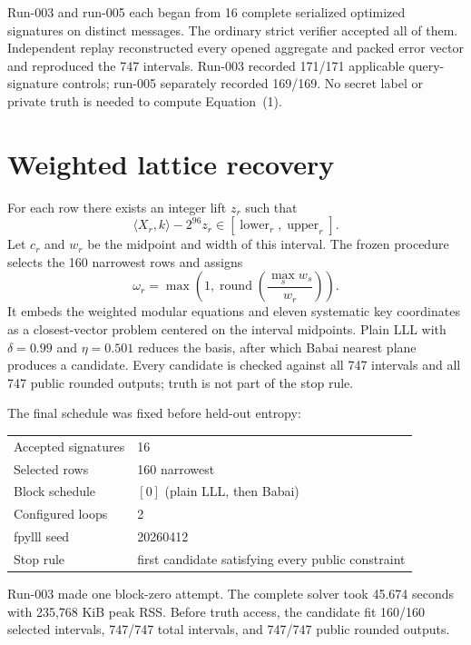 \documentclass[10pt,a4paper]{article}
\begin{document}
Run-003 and run-005 each began from 16 complete serialized optimized signatures
on distinct messages.  The ordinary strict verifier accepted all of them.
Independent replay reconstructed every opened aggregate and packed error
vector and reproduced the 747 intervals.  Run-003 recorded 171/171 applicable
query-signature controls; run-005 separately recorded 169/169.  No secret label
or private truth is needed to compute Equation~(1).

\section{Weighted lattice recovery}

For each row there exists an integer lift $z_r$ such that
\[
\langle X_r,k\rangle-2^{96}z_r\in[\operatorname{lower}_r,
\operatorname{upper}_r].                                  \tag{2}
\]
Let $c_r$ and $w_r$ be the midpoint and width of this interval.  The frozen
procedure selects the 160 narrowest rows and assigns
\[
\omega_r=\max\left(1,
\operatorname{round}\left(\frac{\max_s w_s}{w_r}\right)\right).
\]
It embeds the weighted modular equations and eleven systematic key
coordinates as a closest-vector problem centered on the interval midpoints.
Plain LLL with $\delta=0.99$ and $\eta=0.501$ reduces the basis, after which
Babai nearest plane produces a candidate.  Every candidate is checked against
all 747 intervals and all 747 public rounded outputs; truth is not part of the
stop rule.

The final schedule was fixed before held-out entropy:
\begin{center}
\begin{tabular}{@{}ll@{}}
\toprule
Accepted signatures & 16 \\
Selected rows & 160 narrowest \\
Block schedule & $[0]$ (plain LLL, then Babai) \\
Configured loops & 2 \\
fpylll seed & 20260412 \\
Stop rule & first candidate satisfying every public constraint \\
\bottomrule
\end{tabular}
\end{center}

Run-003 made one block-zero attempt.  The complete solver took 45.674 seconds
with 235,768 KiB peak RSS.  Before truth access, the candidate fit 160/160 selected intervals,
747/747 total intervals, and 747/747 public rounded outputs.
\end{document}
